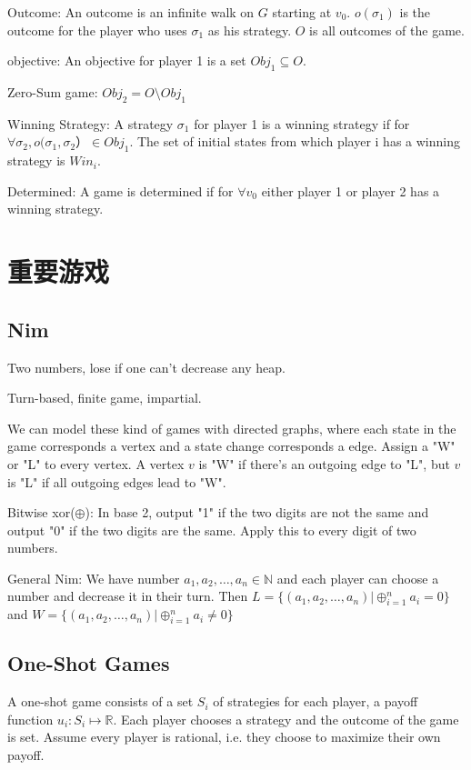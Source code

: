 \documentclass[12pt,a4paper]{ctexrep}
\begin{document}
Outcome: An outcome is an infinite walk on $G$ starting at $v_0$. $o(\sigma_1)$ is the outcome for the player who uses $\sigma_1$ as his strategy. $O$ is all outcomes of the game.

objective: An objective for player 1 is a set $Obj_1 \subseteq O$.

Zero-Sum game: $Obj_2 = O \setminus Obj_1$

Winning Strategy: A strategy $\sigma_1$ for player 1 is a winning strategy if for $\forall \sigma_2, o(\sigma_1,\sigma_2） \in Obj_1$. The set of initial states from which player i has a winning strategy is $Win_i$.

Determined: A game is determined if for $\forall v_0$ either player 1 or player 2 has a winning strategy.
\section{重要游戏}
\subsection{Nim}
Two numbers, lose if one can't decrease any heap.

Turn-based, finite game, impartial.

We can model these kind of games with directed graphs, where each state in the game corresponds a vertex and a state change corresponds a edge. Assign a "W" or "L" to every vertex. A vertex $v$ is "W" if there's an outgoing edge to "L", but $v$ is "L" if all outgoing edges lead to "W".

Bitwise xor($\oplus$): In base 2, output "1" if the two digits are not the same and output "0" if the two digits are the same. Apply this to every digit of two numbers.

General Nim: We have number $a_1,a_2,\dots,a_n \in \mathbb{N}$ and each player can choose a number and decrease it in their turn. Then $L = \{(a_1,a_2,\dots,a_n)|\oplus_{i=1}^n a_i = 0\}$ and $W = \{(a_1,a_2,\dots,a_n)|\oplus_{i=1}^n a_i \neq 0\}$

\subsection{One-Shot Games}
A one-shot game consists of a set $S_i$ of strategies for each player, a payoff function $u_i: S_i \mapsto \mathbb{R}$. Each player chooses a strategy and the outcome of the game is set. Assume every player is rational, i.e. they choose to maximize their own payoff.
\end{document}
